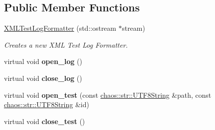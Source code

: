\subsection*{Public Member Functions}
\begin{DoxyCompactItemize}
\item 
\hypertarget{classchaos_1_1test_1_1log__formatter_1_1_x_m_l_test_log_formatter_afeb917496071ad57ba6bc9fd766e1060}{}\hyperlink{classchaos_1_1test_1_1log__formatter_1_1_x_m_l_test_log_formatter_afeb917496071ad57ba6bc9fd766e1060}{X\+M\+L\+Test\+Log\+Formatter} (std\+::ostream $\ast$stream)\label{classchaos_1_1test_1_1log__formatter_1_1_x_m_l_test_log_formatter_afeb917496071ad57ba6bc9fd766e1060}

\begin{DoxyCompactList}\small\item\em Creates a new X\+M\+L Test Log Formatter. \end{DoxyCompactList}\item 
\hypertarget{classchaos_1_1test_1_1log__formatter_1_1_x_m_l_test_log_formatter_a4103c24daf83bff69ad23ba4a7d7e2ad}{}virtual void {\bfseries open\+\_\+log} ()\label{classchaos_1_1test_1_1log__formatter_1_1_x_m_l_test_log_formatter_a4103c24daf83bff69ad23ba4a7d7e2ad}

\item 
\hypertarget{classchaos_1_1test_1_1log__formatter_1_1_x_m_l_test_log_formatter_a5eed2684e7c75ac55f18417d675d3e5a}{}virtual void {\bfseries close\+\_\+log} ()\label{classchaos_1_1test_1_1log__formatter_1_1_x_m_l_test_log_formatter_a5eed2684e7c75ac55f18417d675d3e5a}

\item 
\hypertarget{classchaos_1_1test_1_1log__formatter_1_1_x_m_l_test_log_formatter_a75659e6702e789ad344c061ab65a89c5}{}virtual void {\bfseries open\+\_\+test} (const \hyperlink{classchaos_1_1str_1_1_u_t_f8_string}{chaos\+::str\+::\+U\+T\+F8\+String} \&path, const \hyperlink{classchaos_1_1str_1_1_u_t_f8_string}{chaos\+::str\+::\+U\+T\+F8\+String} \&id)\label{classchaos_1_1test_1_1log__formatter_1_1_x_m_l_test_log_formatter_a75659e6702e789ad344c061ab65a89c5}

\item 
\hypertarget{classchaos_1_1test_1_1log__formatter_1_1_x_m_l_test_log_formatter_a7887aa75de5772511a8f2d3274514343}{}virtual void {\bfseries close\+\_\+test} ()\label{classchaos_1_1test_1_1log__formatter_1_1_x_m_l_test_log_formatter_a7887aa75de5772511a8f2d3274514343}

\end{DoxyCompactItemize}
